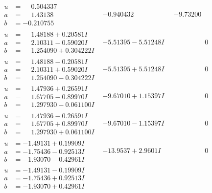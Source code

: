 \documentclass[1p]{elsarticle_modified}
\theoremstyle{definition}
\begin{document}
$$\begin{array}{c|c|c}
\begin{aligned}
u &= \phantom{-}0.504337\phantom{ +0.000000I} \\
a &= \phantom{-}1.43138\phantom{ +0.000000I} \\
b &= -0.210755\phantom{ +0.000000I}\end{aligned}
 & -0.940432\phantom{ +0.000000I} & -9.73200\phantom{ +0.000000I} \\ \hline\begin{aligned}
u &= \phantom{-}1.48188 + 0.20581 I \\
a &= \phantom{-}2.10311 - 0.59020 I \\
b &= \phantom{-}1.254090 + 0.304222 I\end{aligned}
 & -5.51395 - 5.51248 I & \phantom{-0.000000 } 0 \\ \hline\begin{aligned}
u &= \phantom{-}1.48188 - 0.20581 I \\
a &= \phantom{-}2.10311 + 0.59020 I \\
b &= \phantom{-}1.254090 - 0.304222 I\end{aligned}
 & -5.51395 + 5.51248 I & \phantom{-0.000000 } 0 \\ \hline\begin{aligned}
u &= \phantom{-}1.47936 + 0.26591 I \\
a &= \phantom{-}1.67705 - 0.89970 I \\
b &= \phantom{-}1.297930 - 0.061100 I\end{aligned}
 & -9.67010 + 1.15397 I & \phantom{-0.000000 } 0 \\ \hline\begin{aligned}
u &= \phantom{-}1.47936 - 0.26591 I \\
a &= \phantom{-}1.67705 + 0.89970 I \\
b &= \phantom{-}1.297930 + 0.061100 I\end{aligned}
 & -9.67010 - 1.15397 I & \phantom{-0.000000 } 0 \\ \hline\begin{aligned}
u &= -1.49131 + 0.19909 I \\
a &= -1.75436 - 0.92513 I \\
b &= -1.93070 - 0.42961 I\end{aligned}
 & -13.9537 + 2.9601 I & \phantom{-0.000000 } 0 \\ \hline\begin{aligned}
u &= -1.49131 - 0.19909 I \\
a &= -1.75436 + 0.92513 I \\
b &= -1.93070 + 0.42961 I\end{aligned}

\end{array}$$
\end{document}
